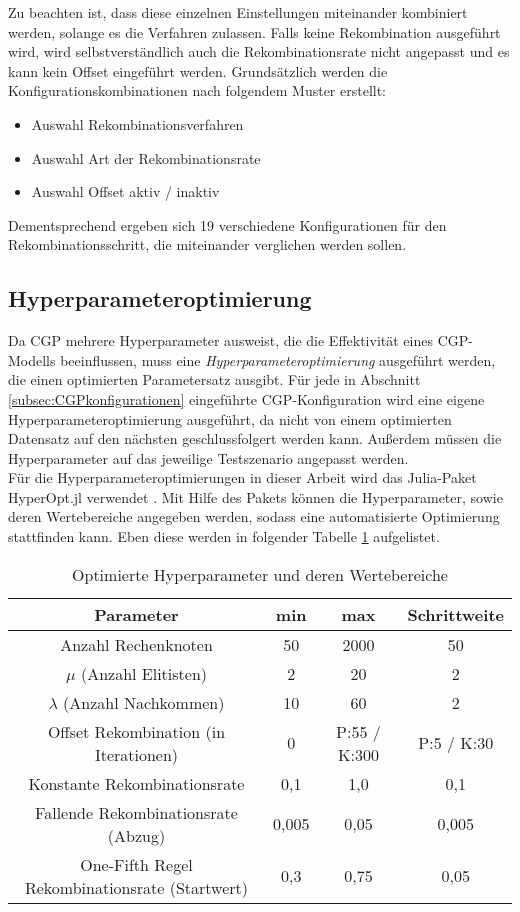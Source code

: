 Zu beachten ist, dass diese einzelnen Einstellungen miteinander kombiniert werden, solange es die Verfahren zulassen.
Falls keine Rekombination ausgeführt wird, wird selbstverständlich auch die Rekombinationsrate nicht angepasst und es kann kein Offset eingeführt werden.
Grundsätzlich werden die Konfigurationskombinationen nach folgendem Muster erstellt:
\begin{itemize}
	\item Auswahl Rekombinationsverfahren
	\item Auswahl Art der Rekombinationsrate
	\item Auswahl Offset aktiv / inaktiv
\end{itemize}

Dementsprechend ergeben sich 19 verschiedene Konfigurationen für den Rekombinationsschritt, die miteinander verglichen werden sollen. 


\subsection{Hyperparameteroptimierung}
\label{subsec:hpo}

Da CGP mehrere Hyperparameter ausweist, die die Effektivität eines CGP-Modells beeinflussen, muss eine \emph{Hyperparameteroptimierung} ausgeführt werden, die einen optimierten Parametersatz ausgibt.
Für jede in Abschnitt \ref{subsec:CGPkonfigurationen} eingeführte CGP-Konfiguration wird eine eigene Hyperparameteroptimierung ausgeführt, da nicht von einem optimierten Datensatz auf den nächsten geschlussfolgert werden kann.
Außerdem müssen die Hyperparameter auf das jeweilige Testszenario angepasst werden.\\
Für die Hyperparameteroptimierungen in dieser Arbeit wird das Julia-Paket HyperOpt.jl verwendet \cite{carlson_baggepinnenhyperoptjl_2025}.
Mit Hilfe des Pakets können die Hyperparameter, sowie deren Wertebereiche angegeben werden, sodass eine automatisierte Optimierung stattfinden kann.
Eben diese werden in folgender Tabelle \ref{table:hyperopt} aufgelistet.

\begin{table}[H]
	\centering
	\begin{tabular}{c | c | c | c}
		\textbf{Parameter} & \textbf{min} & \textbf{max} & \textbf{Schrittweite}\\
		\hline
		Anzahl Rechenknoten & 50 & 2000 & 50 \\
		\hline
		$\mu$ (Anzahl Elitisten) & 2 & 20 & 2\\
		\hline
		$\lambda$ (Anzahl Nachkommen) & 10 & 60 & 2 \\
		\hline
		Offset Rekombination (in Iterationen)& 0 & P:55 / K:300 & P:5 / K:30\\
		\hline
		Konstante Rekombinationsrate & 0,1 & 1,0 & 0,1\\
		\hline
		Fallende Rekombinationsrate (Abzug) & 0,005 & 0,05 & 0,005\\
		\hline
		One-Fifth Regel Rekombinationsrate (Startwert) & 0,3 & 0,75 & 0,05\\
	\end{tabular}
	\caption{Optimierte Hyperparameter und deren Wertebereiche}
	\label{table:hyperopt}
\end{table}

